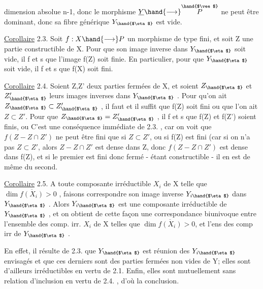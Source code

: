 
dimension absolue n-1, donc le morphisme $\underline{Y}\hand{\longrightarrow} \overset{\hand{$\vee$}}{P}$ ne peut être dominant,
donc sa fibre générique $Y_{\hand{$\eta$}}$ est vide.

\uline{Corollaire} 2.3. Soit $f:X\hand{\longrightarrow} P$ un morphisme de type fini, et soit Z une
partie constructible de X. Pour que son image inverse dans $Y_{\hand{$\eta$}}$ soit vide,
il f et s que l'image f(Z) soit finie. En particulier, pour que  $Y_{\hand{$\eta$}}$ soit
vide, il f et s que f(X) soit fini.

\uline{Corollaire} 2.4. Soient Z,Z' deux parties fermées  de X,
et soient $Z_{\hand{$\eta$}}$ et $Z'_{\hand{$\eta$}}$ leurs images inverses dans $Y_{\hand{$\eta$}}$ . Pour qu'on ait
$Z_{\hand{$\eta$}}\subset Z'_{\hand{$\eta$}}$ , il faut et il suffit que f(Z) soit fini ou que l'on ait $Z\subset Z'$.
Pour que $Z_{\hand{$\eta$}} = Z'_{\hand{$\eta$}}$ , il f et s que  f(Z) et f(Z') soient finis, ou 
 C'est une conséquence 
 immédiate de 2.3. , car on voit que $f(Z - Z\cap Z')$ ne peut être fini
que si $Z\subset Z'$, ou si f(Z) est fini (car si on n'a pas $Z\subset Z'$, alors $Z-Z\cap Z'$
est dense dans Z, donc $f(Z-Z\cap Z')$ est dense dans f(Z), et si le premier
est fini donc fermé - étant constructible - il en est de même du second.

\uline{Corollaire} 2.5. A toute composante irréductible $X_i$ de X telle que
$\dim \overline{f(X_i)} > 0$ , faisons correspondre  son image inverse $Y_{i\hand{$\eta$}}$ dans
$Y_{\hand{$\eta$}}$ . Alors $Y_{i\hand{$\eta$}}$ est une composante irréductible de $Y_{\hand{$\eta$}}$ , et on obtient de
cette façon une correspondance biunivoque entre l'ensemble des comp. irr.
$X_i$ de X telles que $\dim \overline{f(X_i)}> 0$, et l'ens des comp irr de $Y_{\hand{$\eta$}}$ .

En effet, il résulte de 2.3. que  $Y_{\hand{$\eta$}}$ est réunion des $Y_{i\hand{$\eta$}}$ envisagés
et que ces derniers sont des parties fermées non vides de Y; elles sont
d'ailleurs irréductibles en vertu de 2.1. Enfin, elles sont mutuellement
sans relation d'inclusion en vertu de 2.4. , d'où la conclusion.


